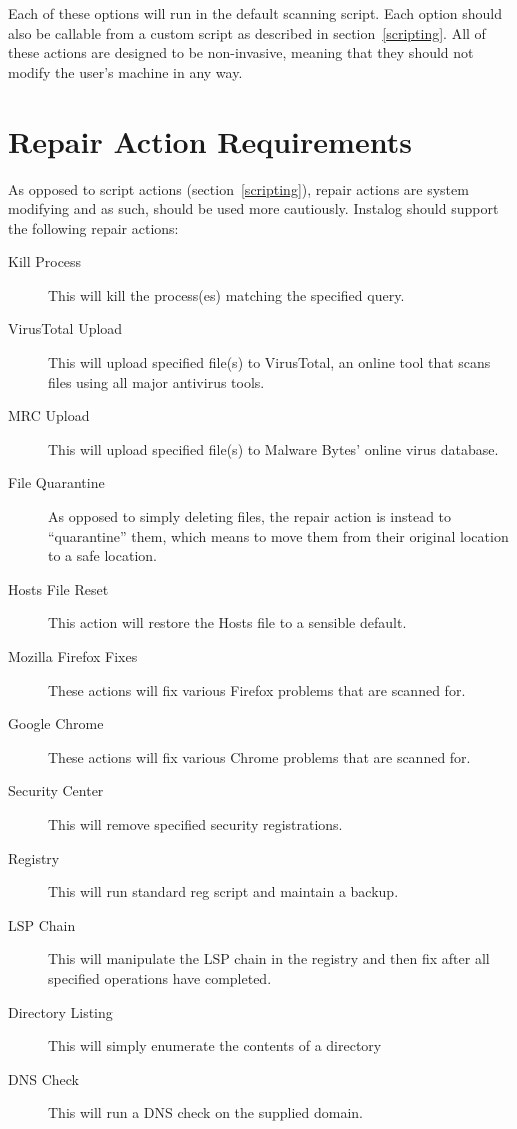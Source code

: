 \documentclass[letterpaper,12pt]{article}
\begin{document}
Each of these options will run in the default scanning script.  Each option
should also be callable from a custom script as described in
section~\ref{scripting}.  All of these actions are designed to be non-invasive,
meaning that they should not modify the user's machine in any way.

\newpage



\section{Repair Action Requirements} \label{repair}
As opposed to script actions (section~\ref{scripting}), repair actions are
system modifying and as such, should be used more cautiously.  Instalog should
support the following repair actions:

\begin{description}
\item[Kill Process] This will kill the process(es) matching the specified query.
\item[VirusTotal Upload] This will upload specified file(s) to VirusTotal, an
online tool that scans files using all major antivirus tools.
\item[MRC Upload] This will upload specified file(s) to Malware Bytes' online
virus database.
\item[File Quarantine] As opposed to simply deleting files, the repair action is
instead to ``quarantine'' them, which means to move them from their original
location to a safe location.
\item[Hosts File Reset] This action will restore the Hosts file to a sensible
default.
\item[Mozilla Firefox Fixes] These actions will fix various Firefox problems
that are scanned for.  
\item[Google Chrome] These actions will fix various Chrome problems
that are scanned for.  
\item[Security Center] This will remove specified security registrations.
\item[Registry] This will run standard reg script and maintain a backup.
\item[LSP Chain] This will manipulate the LSP chain in the registry and then fix
after all specified operations have completed.
\item[Directory Listing] This will simply enumerate the contents of a directory
\item[DNS Check] This will run a DNS check on the supplied domain.
\end{description}
\end{document}
